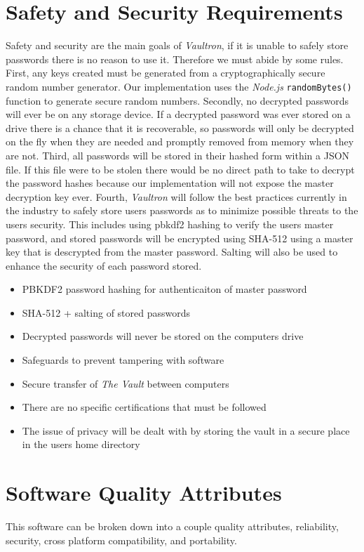 \documentclass[11pt]{report}
\begin{document}
\section{Safety and Security Requirements}
Safety and security are the main goals of \textit{Vaultron}, if it is
unable to safely store passwords there is no reason to use it. Therefore
we must abide by some rules. First, any keys created must be generated
from a cryptographically secure random number generator. Our implementation
uses the \textit{Node.js} \texttt{randomBytes()} function to generate
secure random numbers. Secondly, no decrypted passwords will ever be
on any storage device. If a decrypted password was ever stored on a drive
there is a chance that it is recoverable, so passwords will only be 
decrypted on the fly when they are needed and promptly removed from
memory when they are not. Third, all passwords will be stored in their
hashed form within a JSON file. If this file were to be stolen there
would be no direct path to take to decrypt the password hashes because
our implementation will not expose the master decryption key ever. 
Fourth, \textit{Vaultron} will follow the best practices currently in the
industry to safely store users passwords as to minimize possible threats
to the users security. This includes using pbkdf2 hashing to verify
the users master password, and stored passwords will be encrypted using
SHA-512 using a master key that is descrypted from the master password.
Salting will also be used to enhance the security of each password stored.

\begin{itemize}
    \item PBKDF2 password hashing for authenticaiton of master password
    \item SHA-512 + salting of stored passwords
    \item Decrypted passwords will never be stored on the computers drive
    \item Safeguards to prevent tampering with software
    \item Secure transfer of \textit{The Vault} between computers
    \item There are no specific certifications that must be followed
    \item The issue of privacy will be dealt with by storing the vault in a secure place in the users home directory
\end{itemize}


\section{Software Quality Attributes}
This software can be broken down into a couple quality attributes,
reliability, security, cross platform compatibility, and portability.
\end{document}
